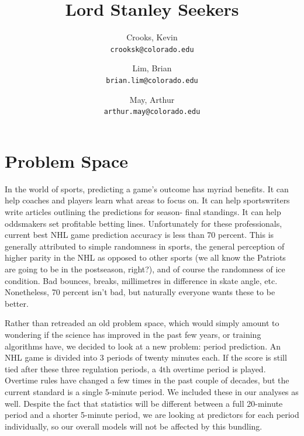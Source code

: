 \documentclass[twocolumn,letterpaper,12pt,notitlepage]{article}
\begin{document}
\title{Lord Stanley Seekers}

\author{
  Crooks, Kevin\\
  \texttt{crooksk@colorado.edu}
  \and
  Lim, Brian\\
  \texttt{brian.lim@colorado.edu}
  \and
  May, Arthur\\
  \texttt{arthur.may@colorado.edu}
}


\twocolumn[
\begin{@twocolumnfalse}
\maketitle
\end{@twocolumnfalse}
]

\section{Problem Space}
In the world of sports, predicting a game’s outcome has myriad benefits. It can help coaches and players
learn what areas to focus on. It can help sportswriters write articles outlining the predictions for season-
final standings. It can help oddsmakers set profitable betting lines. Unfortunately for these professionals, current best NHL game prediction accuracy is less than 70 percent. This is generally attributed to simple
randomness in sports, the general perception of higher parity in the NHL as opposed to other sports (we
all know the Patriots are going to be in the postseason, right?), and of course the randomness of ice
condition. Bad bounces, breaks, millimetres in difference in skate angle, etc. Nonetheless, 70 percent isn’t bad,
but naturally everyone wants these to be better.  \newline

Rather than retreaded an old problem space, which would simply amount to wondering if the science has improved in the past few years, or training algorithms have, we decided to look at a new
problem: period prediction. An NHL game is divided into 3 periods of twenty minutes each. If the score
is still tied after these three regulation periods, a 4th  overtime period is played. Overtime rules have
changed a few times in the past couple of decades, but the current standard is a single 5-minute period.
We included these in our analyses as well. Despite the fact that statistics will be different between a full
20-minute period and a shorter 5-minute period, we are looking at predictors for each period individually,
so our overall models will not be affected by this bundling. \newline
\end{document}
